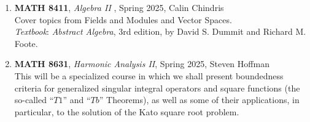 \documentclass{article}
\begin{document}
\begin{enumerate}[leftmargin=*]
    \item[] \textbf{MATH 8411}, \textit{Algebra II} , Spring 2025, Calin Chindris\\
    Cover topics from Fields and Modules and Vector Spaces. \\
    \textit{Textbook}: \textit{Abstract Algebra}, 3rd edition, by David S. Dummit and Richard M. Foote.

    \item[] \textbf{MATH 8631}, \textit{Harmonic Analysis II}, Spring 2025, Steven Hoffman\\
    This will be a specialized course in which we shall present boundedness criteria for generalized singular integral operators and square functions (the so-called ``$T1$'' and ``$Tb$'' Theorems), as well as some of their applications, in particular, to the solution of the Kato square root problem. 
\end{enumerate}
\end{document}
